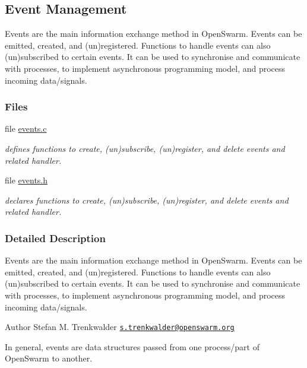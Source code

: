 \hypertarget{group__events}{}\subsection{Event Management}
\label{group__events}


Events are the main information exchange method in Open\+Swarm. Events can be emitted, created, and (un)registered. Functions to handle events can also (un)subscribed to certain events. It can be used to synchronise and communicate with processes, to implement asynchronous programming model, and process incoming data/signals.  


\subsubsection*{Files}
\begin{DoxyCompactItemize}
\item 
file \hyperlink{events_8c}{events.\+c}
\begin{DoxyCompactList}\small\item\em defines functions to create, (un)subscribe, (un)register, and delete events and related handler. \end{DoxyCompactList}\item 
file \hyperlink{events_8h}{events.\+h}
\begin{DoxyCompactList}\small\item\em declares functions to create, (un)subscribe, (un)register, and delete events and related handler. \end{DoxyCompactList}\end{DoxyCompactItemize}


\subsubsection{Detailed Description}
Events are the main information exchange method in Open\+Swarm. Events can be emitted, created, and (un)registered. Functions to handle events can also (un)subscribed to certain events. It can be used to synchronise and communicate with processes, to implement asynchronous programming model, and process incoming data/signals. 

\begin{DoxyAuthor}{Author}
Stefan M. Trenkwalder \href{mailto:s.trenkwalder@openswarm.org}{\tt s.\+trenkwalder@openswarm.\+org}
\end{DoxyAuthor}
In general, events are data structures passed from one process/part of Open\+Swarm to another.

